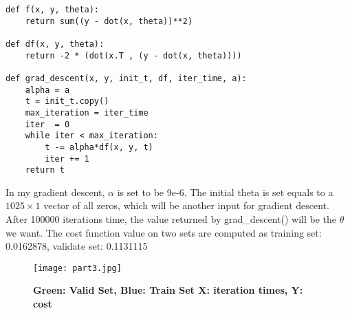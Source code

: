 \documentclass{article}
\begin{document}
\Large\begin{lstlisting}[basicstyle=\ttfamily]
def f(x, y, theta):
    return sum((y - dot(x, theta))**2)
    
def df(x, y, theta):
    return -2 * (dot(x.T , (y - dot(x, theta))))

def grad_descent(x, y, init_t, df, iter_time, a):
    alpha = a
    t = init_t.copy()
    max_iteration = iter_time
    iter  = 0
    while iter < max_iteration:
        t -= alpha*df(x, y, t)
        iter += 1
    return t
\end{lstlisting}

\noindent In my gradient descent, $\alpha$ is set to be 9e-6. The initial theta is set equals to a $1025 \times 1$ vector of all zeros, which will be another input for gradient descent.  After 100000 iterations time, the value returned by grad\_descent() will be the $\theta$ we want. The cost function value on two sets are computed as training set: 0.0162878, validate set: 0.1131115

\begin{figure}[!htb]
  \texttt{[image: part3.jpg]}
  \caption*{\Large \textbf{\hspace*{2.5cm}Green: Valid Set, Blue: Train Set \newline X: iteration times, Y: cost}} \label{fig:part3}
\end{figure}
\end{document}
